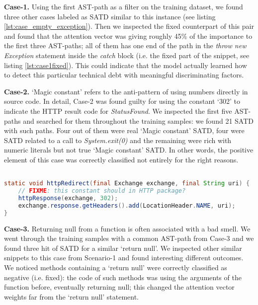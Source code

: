 \textbf{Case-1.} Using the first AST-path as a filter on the training dataset, we found three other cases labeled as SATD similar to this instance (see listing \ref{lst:case_empty_exception}). Then we inspected the fixed counterpart of this pair and found that the attention vector was giving roughly 45\% of the importance to the first three AST-paths; all of them has one end of the path in the \textit{throw new Exception} statement inside the \textit{catch} block (i.e. the fixed part of the snippet, see listing \ref{lst:case1fixed}). This could indicate that the model actually learned how to detect this particular technical debt with meaningful discriminating factors.


\textbf{Case-2.} `Magic constant' refers to the anti-pattern of using numbers directly in source code. In detail, Case-2 was found guilty for using the constant `302' to indicate the HTTP result code for \textit{StatusFound}. We inspected the first five AST-paths and searched for them throughout the training samples: we found 21 SATD with such paths. Four out of them were real `Magic constant' SATD, four were SATD related to a call to \textit{System.exit(0)} and the remaining were rich with numeric literals but not true `Magic constant' SATD. In other words, the positive element of this case was correctly classified not entirely for the right reasons.



\begin{lstlisting}[caption={Correctly detected SATD, verbatim Case-2}, label={lst:case_magic_constant},language=Java]

static void httpRedirect(final Exchange exchange, final String uri) {
    // FIXME: this constant should in HTTP package?
    httpResponse(exchange, 302);
    exchange.response.getHeaders().add(LocationHeader.NAME, uri);
}

\end{lstlisting}


\textbf{Case-3.} Returning null from a function is often associated with a bad smell. We went through the training samples with a common AST-path from Case-3 and we found three hit of SATD for a similar `return null'. We inspected other similar snippets to this case from Scenario-1 and found interesting different outcomes. We noticed methods containing a `return null' were correctly classified as negative (i.e. fixed): the code of such methods was using the arguments of the function before, eventually returning null; this changed the attention vector weights far from the `return null' statement. 


